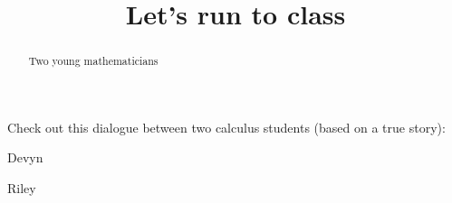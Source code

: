 \documentclass{ximera}
\title[Break-Ground:]{Let's run to class}
\begin{document}
\begin{abstract}
Two young mathematicians 
\end{abstract}
\maketitle

Check out this dialogue between two calculus students (based on a true
story):


\begin{dialogue}
\item[Devyn] 
\item[Riley] 
\end{dialogue}

\begin{problem}
\end{problem}


\end{document}
